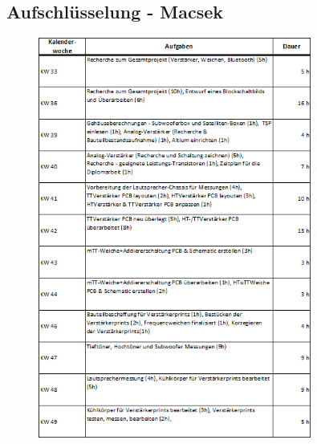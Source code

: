 \subsection{Aufschlüsselung - Macsek}
\begin{figure} [H]
	\centering
	\includegraphics[width=0.8\textwidth]{form/ArbeitsnachweisMacsek1von3.png}
\end{figure}

